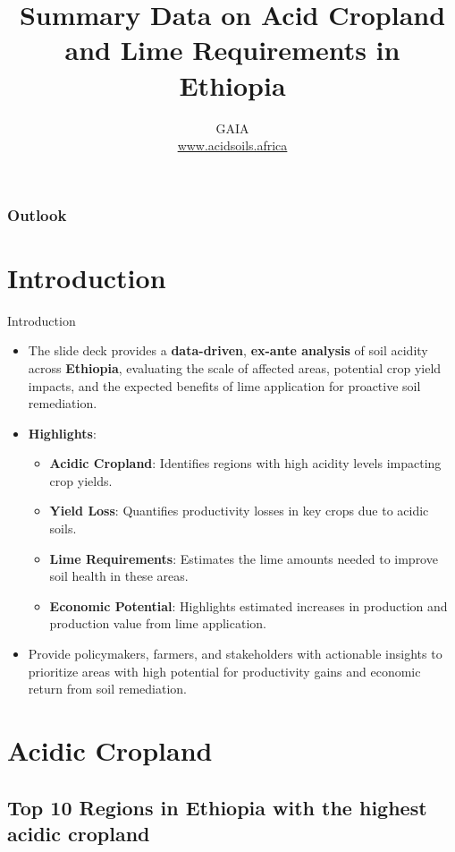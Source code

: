 \documentclass[xcolor=table, aspectratio=1610]{beamer}
\title[Ethiopia--Summary]{\textsf{Summary Data on Acid Cropland and Lime Requirements in Ethiopia}}
\author[GAIA]{GAIA\\ \href{www.acidsoils.africa}{www.acidsoils.africa} }
\institute[CIMMYT]
\begin{document}
\begin{frame}[plain]
\textsc{\titlepage}
\end{frame}

\begin{frame}
\frametitle{Outlook}
\tableofcontents 
\end{frame}

\section{Introduction}
\begin{frame}{Introduction}
    \begin{itemize}
        \item The slide deck provides a \textbf{data-driven}, \textbf{ex-ante analysis} of soil acidity across \textbf{Ethiopia}, evaluating the scale of affected areas, potential crop yield impacts, and the expected benefits of lime application for proactive soil remediation.
        \bigskip
        \item \textbf{Highlights}:
        \begin{itemize}
            \item \textbf{Acidic Cropland}: Identifies regions with high acidity levels impacting crop yields.
            \item \textbf{Yield Loss}: Quantifies productivity losses in key crops due to acidic soils.
            \item \textbf{Lime Requirements}: Estimates the lime amounts needed to improve soil health in these areas.
            \item \textbf{Economic Potential}: Highlights estimated increases in production and production value from lime application.
        \end{itemize}
        \bigskip
        \item Provide policymakers, farmers, and stakeholders with actionable insights to prioritize areas with high potential for productivity gains and economic return from soil remediation.
    \end{itemize}
\end{frame}
\section{Acidic Cropland}
\subsection*{Top 10 Regions in Ethiopia with the highest acidic cropland}
\end{document}
